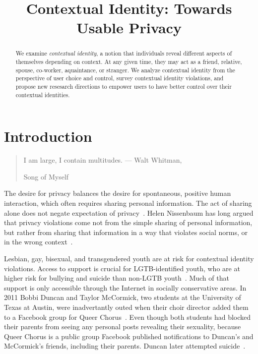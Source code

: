 \documentclass[10pt, conference, compsocconf]{IEEEtran}
\begin{document}
\title{Contextual Identity: Towards Usable Privacy}

\author{
}
\maketitle

\begin{abstract}
We examine \textit{contextual identity}, a notion that individuals reveal
different aspects of themselves depending on context. At any given time, they
may act as a friend, relative, spouse, co-worker, aquaintance, or stranger. We
analyze contextual identity from the perspective of user choice and control,
survey contextual identity violations, and propose new resesarch directions to
empower users to have better control over their contextual identities.
\end{abstract}

\section{Introduction}
\begin{quote}I am large, I contain multitudes. --- Walt Whitman,
\begin{em}Song of Myself\end{em} \end{quote}

The desire for privacy balances the desire for spontaneous, positive human
interaction, which often requires sharing personal information. The act of
sharing alone does not negate expectation of privacy~\cite{boyd2}.
Helen Nissenbaum has long argued that privacy violations come not from the
simple sharing of personal information, but rather from sharing that
information in a way that violates social norms, or in the wrong
context~\cite{nissenbaum}.

Lesbian, gay, bisexual, and transgendered youth are at risk for contextual
identity violations.  Access to support is crucial for LGTB-identified youth,
who are at higher risk for bullying and suicide than non-LGTB youth~\cite{hrc}.
Much of that support is only accessible through the Internet in socially
conservative areas. In 2011 Bobbi Duncan and Taylor McCormick, two
students at the University of Texas at Austin, were inadvertantly outed when
their choir director added them to a Facebook group for Queer
Chorus~\cite{fowler}. Even though both students had blocked their parents from
seeing any personal posts revealing their sexuality, because Queer Chorus is a
public group Facebook published notifications to Duncan's and McCormick's
friends, including their parents. Duncan later attempted suicide~\cite{duncan}.
\end{document}
